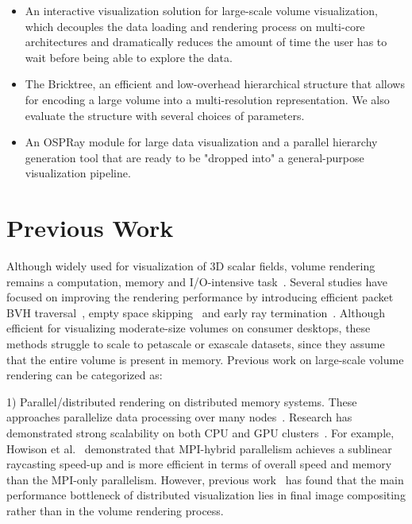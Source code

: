 \begin{itemize}
\item An interactive visualization solution for large-scale volume
visualization, which decouples the data loading and rendering process 
on multi-core architectures and dramatically reduces the amount of time the user has to
wait before being able to explore the data. 
\item The Bricktree, an efficient and low-overhead hierarchical structure that
allows for encoding a large volume into a multi-resolution representation.
We also evaluate the structure with several choices of parameters. 
\item An OSPRay module for large data visualization
and a parallel hierarchy generation tool that are ready to be 
"dropped into" a general-purpose visualization pipeline.  
\end{itemize}



\section{Previous Work}

Although widely used for visualization of 3D scalar fields, volume rendering
remains a computation, memory and I/O-intensive task~\cite{wu2018visit}. 
Several studies have focused on improving the rendering performance by
introducing efficient packet BVH traversal~\cite{knoll2011full,wald2017ospray}, 
empty space skipping~\cite{hadwiger2018sparseleap} and
early ray termination~\cite{levoy1990efficient,kruger2003acceleration}.
Although efficient for visualizing moderate-size volumes on consumer desktops, 
these methods struggle to scale to petascale or exascale datasets, since they assume that the entire volume is present in memory. 
Previous work on large-scale volume rendering
can be categorized as: 

1) Parallel/distributed rendering on distributed memory systems. These approaches
parallelize data processing over many nodes~\cite{childs2010extreme}. Research
has demonstrated strong scalability on both CPU and GPU clusters~\cite{childs2006scalable,
howison2012hybrid,peterka2008parallel,eilemann2009equalizer,fogal2010large,beyer2011distributed}. 
For example, Howison et al.~\cite{howison2012hybrid} demonstrated that MPI-hybrid
parallelism achieves a sublinear raycasting speed-up and is more efficient in terms of
overall speed and memory than the MPI-only parallelism.
However, previous work~\cite{wu2018visit} has found that the main
performance bottleneck of distributed visualization lies in final image compositing
rather than in the volume rendering process.

